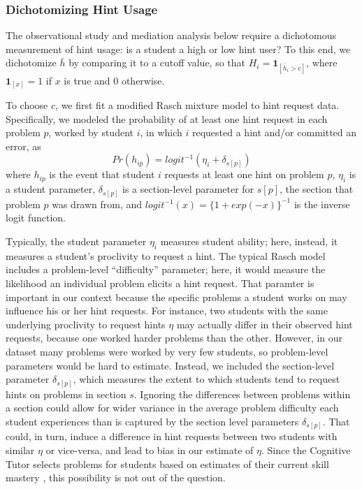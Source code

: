 \documentclass{article}\usepackage[]{graphicx}\usepackage[]{color}
\newcommand{\indicator}[1]{\mathbf{1}_{\left[ {#1} \right] }}
\begin{document}
\subsubsection{Dichotomizing Hint Usage}\label{sec:dichotomizingHintUsage}
The observational study and mediation analysis below require a dichotomous measurement of hint usage: is a
student a high or low hint user?
To this end, we dichotomize $\bar{h}$ by comparing it to a cutoff value, so
that $H_i=\indicator{\bar{h}_i>c}$, where $\indicator{x}=1$ if $x$ is true
and 0 otherwise.

To choose $c$, we first fit a modified Rasch mixture model
\citep{rasch} to hint request data.
Specifically, we modeled the probability of at least one hint request in each problem
$p$, worked by student $i$, in which $i$ requested a hint and/or
committed an error, as
\begin{equation}\label{eq:rasch}
Pr(h_{ip})=logit^{-1}(\eta_i+\delta_{s[p]})
\end{equation}
where $h_{ip}$ is the event that student $i$ requests at least one hint on
problem $p$, $\eta_i$ is a student parameter, $\delta_{s[p]}$ is a
section-level parameter for $s[p]$, the section that problem $p$ was
drawn from, and $logit^{-1}(x)=\{1+exp(-x)\}^{-1}$ is the inverse logit
function.

Typically, the student parameter $\eta_i$ measures student ability;
here, instead, it measures a student's proclivity to request a hint.
The typical Rasch model includes a problem-level ``difficulty''
parameter; here, it would measure the likelihood an individual problem
elicits a hint request.
That paramter is important in our context because the
specific problems a student works on may influence his or her hint
requests.
For instance, two students with the same underlying proclivity to request
hints $\eta$ may actually differ in their observed hint requests, because one
worked harder problems than the other.
However, in our dataset many problems were worked by very few students, so problem-level parameters would be hard to estimate.
Instead, we included the section-level parameter $\delta_{s[p]}$,
which measures the extent to which students tend to request hints on
problems in section $s$.
Ignoring the differences between problems within a section could allow for wider
variance in the average problem difficulty each student experiences
than is captured by the section level parameters $\delta_{s[p]}$.
That could, in turn, induce a difference in hint requests between two
students with similar $\eta$ or vice-versa, and lead
to bias in our estimate of $\eta$.
Since the Cognitive Tutor selects problems for students based on estimates
of their current skill mastery \citep{steveFaied2020}, this
possibility is not out of the question.
\end{document}
